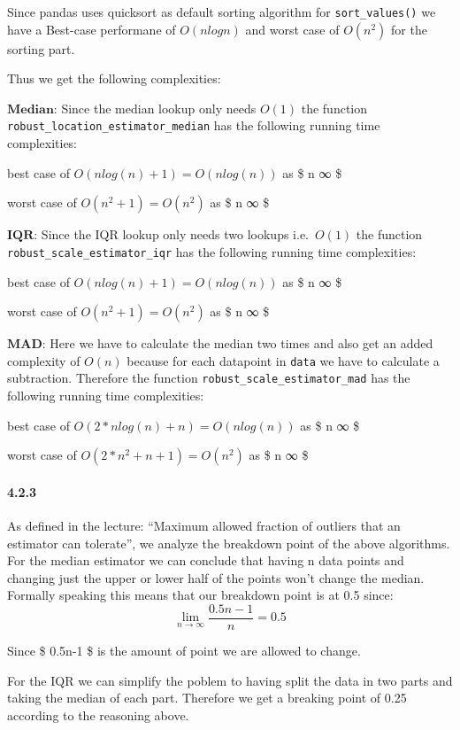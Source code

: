 \documentclass[11pt]{article}
\begin{document}
    Since pandas uses quicksort as default sorting algorithm for
\texttt{sort\_values()} we have a Best-case performane of \(O(nlogn)\)
and worst case of \(O(n^2)\) for the sorting part.

Thus we get the following complexities:

\(\textbf{Median}\): Since the median lookup only needs \(O(1)\) the
function \texttt{robust\_location\_estimator\_median} has the following
running time complexities:

best case of \(O(nlog(n)+1) = O(nlog(n))\) as \$ n \rightarrow ∞ \$

worst case of \(O(n^2+1) = O(n^2)\) as \$ n \rightarrow ∞ \$

\(\textbf{IQR}\): Since the IQR lookup only needs two lookups
i.e.~\(O(1)\) the function \texttt{robust\_scale\_estimator\_iqr} has
the following running time complexities:

best case of \(O(nlog(n)+1) = O(nlog(n))\) as \$ n \rightarrow ∞ \$

worst case of \(O(n^2+1) = O(n^2)\) as \$ n \rightarrow ∞ \$

\(\textbf{MAD}\): Here we have to calculate the median two times and
also get an added complexity of \(O(n)\) because for each datapoint in
\texttt{data} we have to calculate a subtraction. Therefore the function
\texttt{robust\_scale\_estimator\_mad} has the following running time
complexities:

best case of \(O(2* nlog(n) + n) = O(nlog(n))\) as \$ n \rightarrow ∞ \$

worst case of \(O(2* n^2+n+1) = O(n^2)\) as \$ n \rightarrow ∞ \$

    \hypertarget{section}{%
\paragraph{4.2.3}\label{section}}

    As defined in the lecture: ``Maximum allowed fraction of outliers that
an estimator can tolerate'', we analyze the breakdown point of the above
algorithms. For the median estimator we can conclude that having n data
points and changing just the upper or lower half of the points won't
change the median. Formally speaking this means that our breakdown point
is at 0.5 since: \[ \lim_{n \to ∞}\frac{0.5 n-1}{n} = 0.5 \]

Since \$ 0.5n-1 \$ is the amount of point we are allowed to change.

For the IQR we can simplify the poblem to having split the data in two
parts and taking the median of each part. Therefore we get a breaking
point of 0.25 according to the reasoning above.
\end{document}
